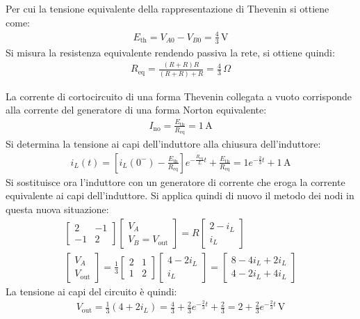 \documentclass{article}
\begin{document}
Per cui la tensione equivalente della rappresentazione di Thevenin si ottiene come:
\begin{gather*}
    E_\mathrm{th}=V_{A0}-V_{B0}=\displaystyle\frac{4}{3}\,\mathrm{V}
\end{gather*}
Si misura la resistenza equivalente rendendo passiva la rete, si ottiene quindi:
\begin{gather*}
    R_\mathrm{eq}=\displaystyle\frac{(R+R)R}{(R+R)+R}=\frac{4}{3}\,\Omega
\end{gather*}

La corrente di cortocircuito di una forma Thevenin collegata a vuoto corrisponde alla corrente del generatore di una forma Norton equivalente:
\begin{gather*}
    I_\mathrm{no}=\displaystyle\frac{E_\mathrm{th}}{R_\mathrm{eq}}=1\,\mathrm{A}
\end{gather*}
Si determina la tensione ai capi dell'induttore alla chiusura dell'induttore: 
\begin{gather*}
    i_L(t)=\left[\displaystyle i_L(0^-)-\frac{E_\mathrm{th}}{R_\mathrm{eq}}\right]e^{-\frac{R_\mathrm{eq}}{L}t}+\frac{E_\mathrm{th}}{R_\mathrm{eq}}=1e^{-\frac{2}{3}t}+1\,\mathrm{A}
\end{gather*}
Si sostituisce ora l'induttore con un generatore di corrente che eroga la corrente equivalente ai capi dell'induttore. Si applica quindi di nuovo il metodo dei nodi in questa 
nuova situazione:
\begin{gather*}
    \begin{bmatrix}
        2&-1\\-1&2
    \end{bmatrix}\begin{bmatrix}
        V_{A}\\V_{B}=V_\mathrm{out}
    \end{bmatrix}=
    R\begin{bmatrix}
        2-i_L\\i_L
    \end{bmatrix}\\
    \begin{bmatrix}
        V_{A}\\V_\mathrm{out}
    \end{bmatrix}=\displaystyle\frac{1}{3}
    \begin{bmatrix}
        2&1\\1&2
    \end{bmatrix}\begin{bmatrix}
        4-2i_L\\i_L
    \end{bmatrix}=\begin{bmatrix}
        8-4i_L+2i_L\\
        4-2i_L+4i_L
    \end{bmatrix}
\end{gather*}
La tensione ai capi del circuito è quindi: 
\begin{gather}
    V_\mathrm{out}=\displaystyle\frac{1}{3}\left(4+2i_L\right)=\frac{4}{3}+\frac{2}{3}e^{-\frac{2}{3}t}+\frac{2}{3}=2+\frac{2}{3}e^{-\frac{2}{3}t}\,\mathrm{V}
\end{gather}
\end{document}
